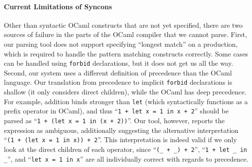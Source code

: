\documentclass[runningheads]{llncs}
\newcommand{\ocaml}{\lstinline[language={[objective]caml}]}
\newcommand{\syncon}{\lstinline[language=syncon]}
\begin{document}
\paragraph{Current Limitations of Syncons}
%
Other than syntactic OCaml constructs that are not yet specified,
there are two sources of failure in the parts of the OCaml
compiler that we cannot parse.
%
First, our parsing tool does not support specifying ``longest
match'' on a production, which is required to handle the pattern
matching constructs correctly. Some cases can be handled using
\syncon{forbid} declarations, but it does not get us all the way.
%
Second, our system uses a different definition of precedence than
the OCaml language. Our translation from precedence to implicit
\syncon{forbid} declarations is shallow (it only considers direct
children), while the OCaml has deep precedence. For example,
addition binds stronger than \ocaml{let} (which syntactically
functions as a prefix operator in OCaml), and thus
%
``\ocaml{1 + let x = 1 in x + 2}'' should be parsed as
%
``\ocaml{1 + (let x = 1 in (x + 2))}''. Our tool, however, reports
the expression as ambiguous, additionally suggesting the
alternative interpretation
%
``\ocaml{(1 + (let x = 1 in x)) + 2}''.
%
This interpretation is indeed valid if we only look at the direct
children of each operator, since ``\ocaml{(_ + _) + 2}'',
``\ocaml{1 + let _ in _}'', and ``\ocaml{let x = 1 in x}'' are all
individually correct with regards to precedence.


\end{document}
